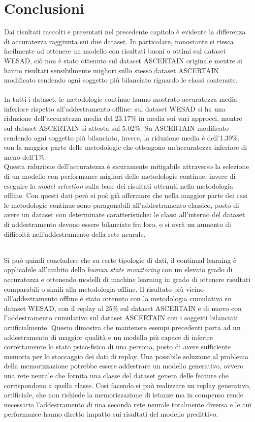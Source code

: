 \chapter{Conclusioni}
Dai risultati raccolti e presentati nel precedente capitolo è evidente la differenza di accuratezza raggiunta sui due dataset. In particolare, nonostante si riesca facilmente ad ottenere un modello con risultati buoni o ottimi sul dataset WESAD, ciò non è stato ottenuto sul dataset ASCERTAIN originale mentre si hanno risultati sensibilmente migliori sullo stesso dataset ASCERTAIN modificato rendendo ogni soggetto più bilanciato riguardo le classi contenute.\\\\
In tutti i dataset, le metodologie continue hanno mostrato accuratezza media inferiore rispetto all'addestramento offline: sul dataset WESAD si ha una riduzione dell'accuratezza media del 23.17\% in media sui vari approcci, mentre sul dataset ASCERTAIN si attesta sul 5.02\%. Su ASCERTAIN modificato rendendo ogni soggetto più bilanciato, invece, la riduzione media è dell'1.39\%, con la maggior parte delle metodologie che ottengono un'accuratezza inferiore di meno dell'1\%.\\
Questa riduzione dell'accuratezza è sicuramente mitigabile attraverso la selezione di un modello con performance migliori delle metodologie continue, invece di eseguire la \textit{model selection} sulla base dei risultati ottenuti nella metodologia offline. Con questi dati però si può già affermare che nella maggior parte dei casi le metodologie continue sono paragonabili all'addestramento classico, posto di avere un dataset con determinate caratteristiche: le classi all'interno del dataset di addestramento devono essere bilanciate fra loro, o si avrà un aumento di difficoltà nell'addestramento della rete neurale.\\\\
\pagebreak

Si può quindi concludere che su certe tipologie di dati, il continual learning è applicabile all'ambito dello \textit{human state monitoring} con un elevato grado di accuratezza e ottenendo modelli di machine learning in grado di ottenere risultati comparabili o simili alla metodologia offline. Il risultato più vicino all'addestramento offline è stato ottenuto con la metodologia cumulativa su dataset WESAD, con il replay al 25\% sul dataset ASCERTAIN e di nuovo con l'addestramento cumulativo sul dataset ASCERTAIN con i soggetti bilanciati artificialmente. Questo dimostra che mantenere esempi precedenti porta ad un addestramento di maggior qualità e un modello più capace di inferire correttamente lo stato psico-fisico di una persona, posto di avere sufficiente memoria per lo stoccaggio dei dati di replay. Una possibile soluzione al problema della memorizzazione potrebbe essere addestrare un modello generativo, ovvero una rete neurale che fornita una classe del dataset genera delle feature che corrispondono a quella classe. Così facendo si può realizzare un replay generativo, artificiale, che non richiede la memorizzazione di istanze ma in compenso rende necessario l'addestramento di una seconda rete neurale totalmente diversa e le cui performance hanno diretto impatto sui risultati del modello predittivo.